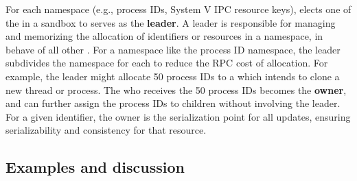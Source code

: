 For each namespace (e.g., process IDs, System V IPC resource keys), \thelibos{} elects one of the \picoprocs{} in a sandbox to serves as the {\bf leader}.
A leader is responsible for
managing and memorizing the allocation of identifiers or resources in a namespace,
in behave of all other \picoprocs{}.
For a namespace like the process ID namespace,
the leader subdivides the namespace for each \picoproc{} to reduce the RPC cost of allocation.
For example, the leader might allocate 50 process IDs to a \picoproc{} which intends to clone a new thread or process.
The \picoproc{} who receives the 50 process IDs becomes the {\bf owner},
and can further assign the process IDs
to children without involving the leader.
For a given identifier, the owner is the serialization point for all updates,
ensuring serializability and consistency for that resource.

\subsection{Examples and discussion}
\label{sec:libos:namespaces:details}


